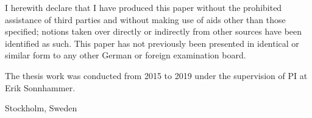 

\begin{declaration}        %

I herewith declare that I have produced this paper without the prohibited assistance of third parties and without making use of aids other than those specified; notions taken over directly or indirectly from other sources have been identified as such. This paper has not previously been presented in identical or similar form to any other German or foreign examination board.

The thesis work was conducted from 2015 to 2019 under the supervision of PI at Erik Sonnhammer.

\vspace{10mm}

Stockholm, Sweden


\end{declaration}


